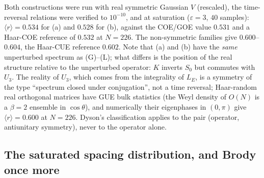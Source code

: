\begin{remark}\label{V3P4:rem:sym}
Both constructions were run with real symmetric Gaussian $V$ (rescaled), the time-reversal
relations were verified to $10^{-10}$, and at saturation ($\varepsilon=3$, $40$ samples):
$\langle r\rangle=0.534$ for (a) and $0.528$ for (b), against the COE/GOE value $0.531$ and a
Haar-COE reference of $0.532$ at $N=226$. The non-symmetric families give $0.600$--$0.604$, the
Haar-CUE reference $0.602$. Note that (a) and (b) have the \emph{same} unperturbed spectrum as
(G)--(L); what differs is the position of the real structure relative to the unperturbed
operator: $K$ inverts $S_0$ but commutes with $U_3$. The reality of $U_3$, which comes from the
integrality of $L_E$, is a symmetry of the type ``spectrum closed under conjugation'', not a time
reversal; Haar-random real orthogonal matrices have GUE bulk statistics (the Weyl density of
$O(N)$ is a $\beta=2$ ensemble in $\cos\theta$), and numerically their eigenphases in $(0,\pi)$
give $\langle r\rangle=0.600$ at $N=226$. Dyson's classification applies to the pair
(operator, antiunitary symmetry), never to the operator alone.
\end{remark}

\subsection*{The saturated spacing distribution, and Brody once more}

